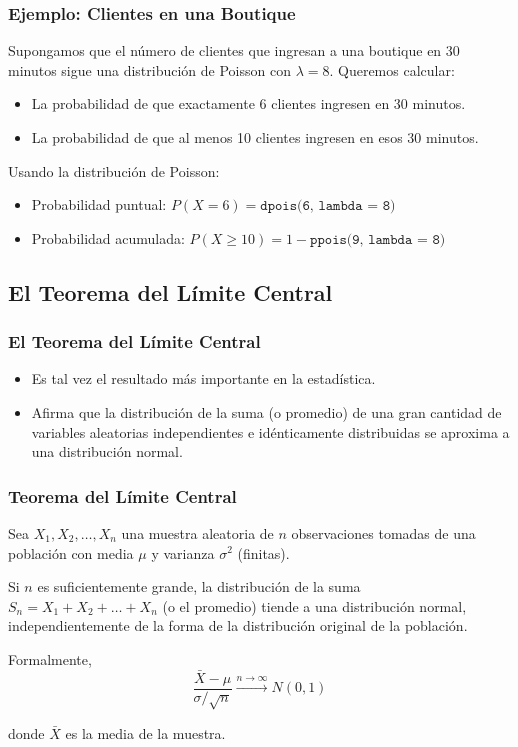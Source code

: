 \documentclass[aspectratio=169]{beamer}
\begin{document}
\begin{frame}
\frametitle{Ejemplo: Clientes en una Boutique}
Supongamos que el número de clientes que ingresan a una boutique en 30 minutos sigue una distribución de Poisson con \(\lambda = 8\). Queremos calcular:

\begin{itemize}
    \item La probabilidad de que exactamente 6 clientes ingresen en 30 minutos.
    \item La probabilidad de que al menos 10 clientes ingresen en esos 30 minutos.
\end{itemize}

Usando la distribución de Poisson:

\begin{itemize}
    \item Probabilidad puntual: \(P(X = 6) = \texttt{dpois(6, lambda = 8)}\)
    \item Probabilidad acumulada: \(P(X \geq 10) = 1 - \texttt{ppois(9, lambda = 8)}\)
\end{itemize}
\end{frame}



\subsection{El Teorema del Límite Central}
\begin{frame} 
\frametitle{El Teorema del Límite Central}
\begin{itemize}
    \item Es tal vez el resultado más importante en la estadística.
    \item Afirma que la distribución de la suma (o promedio) de una gran cantidad de variables aleatorias independientes e idénticamente distribuidas se aproxima a una distribución normal.
\end{itemize}
\end{frame}



\begin{frame}
\frametitle{Teorema del Límite Central}

Sea \(X_1, X_2, \ldots, X_n\) una muestra aleatoria de \( n \) observaciones tomadas de una población con media \( \mu \) y varianza \( \sigma^2 \) (finitas).


\vfill

Si \( n \) es suficientemente grande, la distribución de la suma \( S_n = X_1 + X_2 + \ldots + X_n \) (o el promedio) tiende a una distribución normal, independientemente de la forma de la distribución original de la población.

Formalmente,
\[ \frac{\bar{X} - \mu}{\sigma / \sqrt{n}} \xrightarrow{n \to \infty} N(0,1) \]

donde \( \bar{X} \) es la media de la muestra.
\end{frame}
\end{document}

